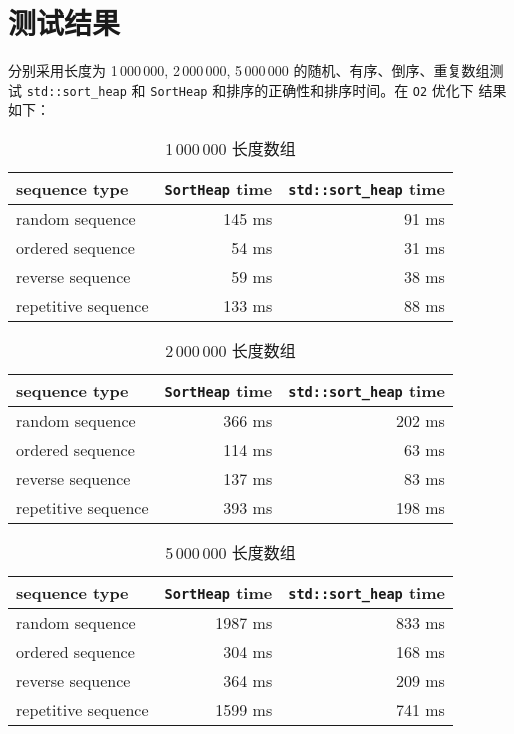 \documentclass[UTF8, 12pt]{ctexart}
\begin{document}
\section{测试结果}
分别采用长度为 1\,000\,000, 2\,000\,000, 5\,000\,000 的随机、有序、倒序、重复数组测试 
\verb|std::sort_heap| 和 \verb|SortHeap| 和排序的正确性和排序时间。在 \verb|O2| 优化下
结果如下：
\begin{table}[hp]
  \centering
  \begin{tabular}{|l|r|r|}
    \hline
    sequence type       & \verb|SortHeap| time & \verb|std::sort_heap| time \\ \hline
    random sequence     & 145 ms               & 91 ms                      \\ \hline
    ordered sequence    & 54 ms                & 31 ms                      \\ \hline
    reverse sequence    & 59 ms                & 38 ms                      \\ \hline
    repetitive sequence & 133 ms               & 88 ms                      \\ \hline
  \end{tabular}
  \caption{1\,000\,000 长度数组}
\end{table}
\begin{table}[hp]
  \centering
  \begin{tabular}{|l|r|r|}
    \hline
    sequence type       & \verb|SortHeap| time & \verb|std::sort_heap| time \\ \hline
    random sequence     & 366 ms               & 202 ms                     \\ \hline
    ordered sequence    & 114 ms               & 63 ms                      \\ \hline
    reverse sequence    & 137 ms               & 83 ms                      \\ \hline
    repetitive sequence & 393 ms               & 198 ms                     \\ \hline
  \end{tabular}
  \caption{2\,000\,000 长度数组}
\end{table}
\begin{table}[hp]
  \centering
  \begin{tabular}{|l|r|r|}
    \hline
    sequence type       & \verb|SortHeap| time & \verb|std::sort_heap| time \\ \hline
    random sequence     & 1987 ms              & 833 ms                     \\ \hline
    ordered sequence    & 304 ms               & 168 ms                     \\ \hline
    reverse sequence    & 364 ms               & 209 ms                     \\ \hline
    repetitive sequence & 1599 ms             & 741 ms                     \\ \hline
  \end{tabular}
  \caption{5\,000\,000 长度数组}
\end{table}
\end{document}
